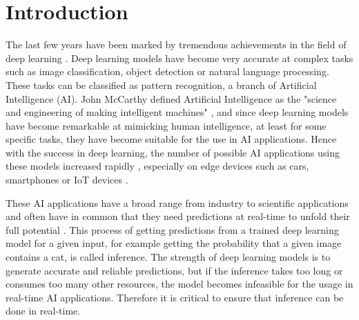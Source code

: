 \chapter{Introduction}

The last few years have been marked by tremendous achievements in the field of deep learning \cite{DBLP:journals/corr/abs-1807-08169,DBLP:journals/corr/abs-1806-08894}.
Deep learning models have become very accurate at complex tasks such as image classification, object detection or natural language processing. 
These tasks can be classified as pattern recognition, a branch of Artificial Intelligence (AI).
John McCarthy defined Artificial Intelligence as the "science and engineering of making intelligent machines" \cite{AI}, and since deep learning models have become remarkable at mimicking human intelligence, at least for some specific tasks, they have become suitable for the use in AI applications.
Hence with the success in deep learning, the number of possible AI applications using these models increased rapidly \cite{inproceedings, breadth}, especially on edge devices such as cars, smartphones or IoT devices \cite{futureMLtiny, MovingToEdge}.

These AI applications have a broad range from industry to scientific applications and often have in common that they need predictions at real-time to unfold their full potential \cite{DBLP:journals/corr/NishiharaMWTPSL17, DBLP:journals/corr/CrankshawBGLZFGJ14}.
This process of getting predictions from a trained deep learning model for a given input, for example getting the probability that a given image contains a cat, is called inference.
The strength of deep learning models is to generate accurate and reliable predictions, but if the inference takes too long or consumes too many other resources, the model becomes infeasible for the usage in real-time AI applications.
Therefore it is critical to ensure that inference can be done in real-time.

